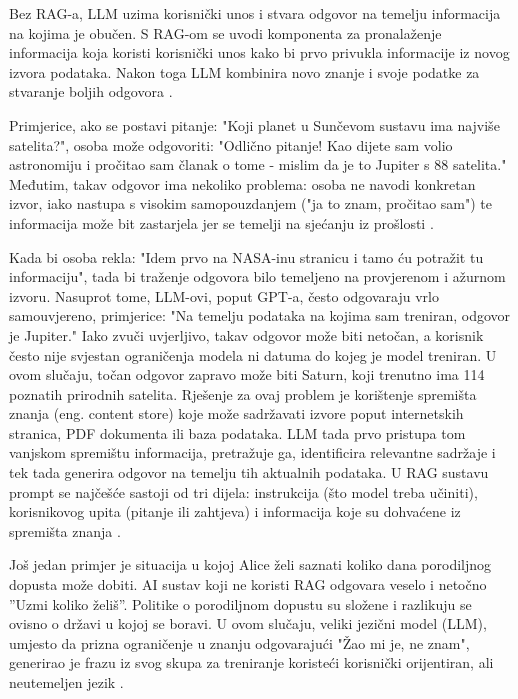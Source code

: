 \documentclass[]{foi}
\begin{document}
Bez RAG-a, LLM uzima korisnički unos i stvara odgovor na temelju informacija na kojima je obučen. S RAG-om se uvodi komponenta za pronalaženje 
informacija koja koristi korisnički unos kako bi prvo privukla informacije iz novog izvora podataka. Nakon toga LLM kombinira novo znanje i svoje 
podatke za stvaranje boljih odgovora \cite{awsRAG2025}.

Primjerice, ako se postavi pitanje: "Koji planet u Sunčevom sustavu ima najviše satelita?", osoba može odgovoriti: "Odlično pitanje! Kao dijete sam volio astronomiju i pročitao sam članak o tome
- mislim da je to Jupiter s 88 satelita." Međutim, takav odgovor ima nekoliko problema: osoba ne navodi konkretan izvor, iako nastupa s visokim samopouzdanjem ("ja to znam, pročitao sam")
te informacija može bit zastarjela jer se temelji na sjećanju iz prošlosti \cite{ibm2023rag}.

Kada bi osoba rekla: "Idem prvo na NASA-inu stranicu i tamo ću potražit tu informaciju", tada bi traženje odgovora bilo temeljeno na provjerenom i ažurnom izvoru.
Nasuprot tome, LLM-ovi, poput GPT-a, često odgovaraju vrlo samouvjereno, primjerice: "Na temelju podataka na kojima sam treniran, odgovor je Jupiter."
Iako zvuči uvjerljivo, takav odgovor može biti netočan, a korisnik često nije svjestan ograničenja modela ni datuma do kojeg je model treniran. U ovom slučaju, točan odgovor 
zapravo može biti Saturn, koji trenutno ima 114 poznatih prirodnih satelita. Rješenje za ovaj problem je korištenje spremišta znanja (eng. content store) koje može sadržavati izvore poput
internetskih stranica, PDF dokumenta ili baza podataka. LLM tada prvo pristupa tom vanjskom spremištu informacija, pretražuje ga, identificira relevantne sadržaje i tek tada generira
odgovor na temelju tih aktualnih podataka. U RAG sustavu prompt se najčešće sastoji od tri dijela: instrukcija (što model treba učiniti), korisnikovog upita (pitanje ili zahtjeva) i informacija 
koje su dohvaćene iz spremišta znanja \cite{ibm2023rag}.

Još jedan primjer je situacija u kojoj Alice želi saznati koliko dana porodiljnog dopusta može dobiti. AI sustav koji ne koristi RAG odgovara veselo i netočno ”Uzmi koliko želiš”.
Politike o porodiljnom dopustu su složene i razlikuju se ovisno o državi u kojoj se boravi. U ovom slučaju, veliki jezični model (LLM), umjesto da prizna ograničenje u znanju odgovarajući
"Žao mi je, ne znam", generirao je frazu iz svog skupa za treniranje koristeći korisnički orijentiran, ali neutemeljen jezik \cite{ibmRAG}.
\end{document}
